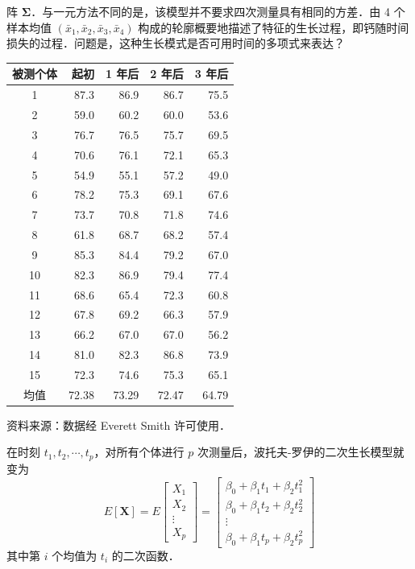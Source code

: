 
阵 $\boldsymbol{\Sigma}$．与一元方法不同的是，该模型并不要求四次测量具有相同的方差．由 4 个样本均值 $(\bar{x}_1,\bar{x}_2,\bar{x}_3,\bar{x}_4)$ 构成的轮廓概要地描述了特征的生长过程，即钙随时间损失的过程．问题是，这种生长模式是否可用时间的多项式来表达？

\begin{mvtable}
\label{tab:6.5}
\begin{tabular}{crrrr}
\toprule
被测个体 & 起初 & 1 年后 & 2 年后 & 3 年后\\
\midrule
1 & 87.3 & 86.9 & 86.7 & 75.5\\
2 & 59.0 & 60.2 & 60.0 & 53.6\\
3 & 76.7 & 76.5 & 75.7 & 69.5\\
4 & 70.6 & 76.1 & 72.1 & 65.3\\
5 & 54.9 & 55.1 & 57.2 & 49.0\\
6 & 78.2 & 75.3 & 69.1 & 67.6\\
7 & 73.7 & 70.8 & 71.8 & 74.6\\
8 & 61.8 & 68.7 & 68.2 & 57.4\\
9 & 85.3 & 84.4 & 79.2 & 67.0\\
10 & 82.3 & 86.9 & 79.4 & 77.4\\
11 & 68.6 & 65.4 & 72.3 & 60.8\\
12 & 67.8 & 69.2 & 66.3 & 57.9\\
13 & 66.2 & 67.0 & 67.0 & 56.2\\
14 & 81.0 & 82.3 & 86.8 & 73.9\\
15 & 72.3 & 74.6 & 75.3 & 65.1\\
\midrule
均值 & 72.38 & 73.29 & 72.47 & 64.79\\
\bottomrule
\end{tabular}
\end{mvtable}

资料来源：数据经 Everett Smith 许可使用．

在时刻 $t_1,t_2,\cdots,t_p$，对所有个体进行 $p$ 次测量后，波托夫-罗伊的二次生长模型就变为
\[
E[\mathbf{X}]=E\begin{bmatrix}X_1\\X_2\\\vdots\\X_p\end{bmatrix}
=\begin{bmatrix}\beta_0+\beta_1t_1+\beta_2t_1^2\\ \beta_0+\beta_1t_2+\beta_2t_2^2\\ \vdots\\ \beta_0+\beta_1t_p+\beta_2t_p^2\end{bmatrix}
\]
其中第 $i$ 个均值为 $t_i$ 的二次函数．

